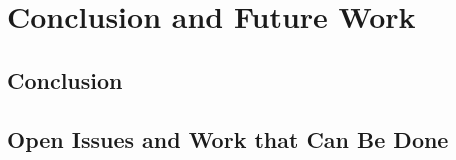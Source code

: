 \chapter{Conclusion and Future Work}
\label{chap:Conclusion}



\section{Conclusion}


\section{Open Issues and Work that Can Be Done}